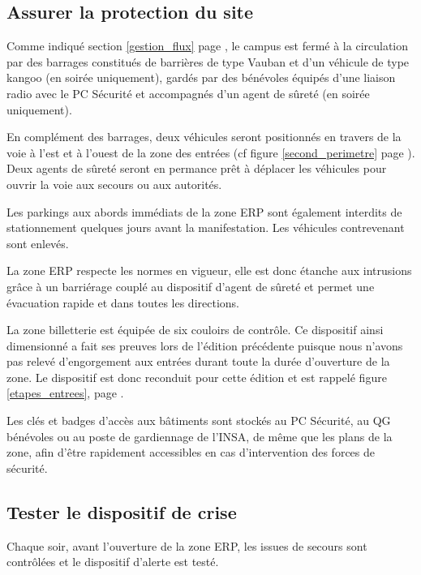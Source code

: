 \documentclass[hidelinks, paper=a4, fontsize=13pt]{report}
\begin{document}
\subsection{Assurer la protection du site}
\begin{list}{•}{}
	\item Comme indiqué section \ref{gestion_flux} page \pageref{gestion_flux}, le campus est fermé à la circulation par des barrages constitués de barrières de type Vauban et d'un véhicule de type kangoo (en soirée uniquement), gardés par des bénévoles équipés d'une liaison radio avec le PC Sécurité et accompagnés d'un agent de sûreté (en soirée uniquement).
	\item En complément des barrages, deux véhicules seront positionnés en travers de la voie à l'est et à l'ouest de la zone des entrées (cf figure \ref{second_perimetre} page \pageref{second_perimetre}). Deux agents de sûreté seront en permance prêt à déplacer les véhicules pour ouvrir la voie aux secours ou aux autorités.
	\item Les parkings aux abords immédiats de la zone ERP sont également interdits de stationnement quelques jours avant la manifestation. Les véhicules contrevenant sont enlevés.
	\item La zone ERP respecte les normes en vigueur, elle est donc étanche aux intrusions grâce à un barriérage couplé au dispositif d'agent de sûreté et permet une évacuation rapide et dans toutes les directions.
	\item La zone billetterie est équipée de six couloirs de contrôle. Ce dispositif ainsi dimensionné a fait ses preuves lors de l'édition précédente puisque nous n'avons pas relevé d'engorgement aux entrées durant toute la durée d'ouverture de la zone. Le dispositif est donc reconduit pour cette édition et est rappelé figure \ref{etapes_entrees}, page \pageref{etapes_entrees}.
	\item Les clés et badges d'accès aux bâtiments sont stockés au PC Sécurité, au QG bénévoles ou au poste de gardiennage de l'INSA, de même que les plans de la zone, afin d'être rapidement accessibles en cas d'intervention des forces de sécurité.
\end{list}

\subsection{Tester le dispositif de crise}
Chaque soir, avant l'ouverture de la zone ERP, les issues de secours sont contrôlées et le dispositif d'alerte est testé.\\
\end{document}
